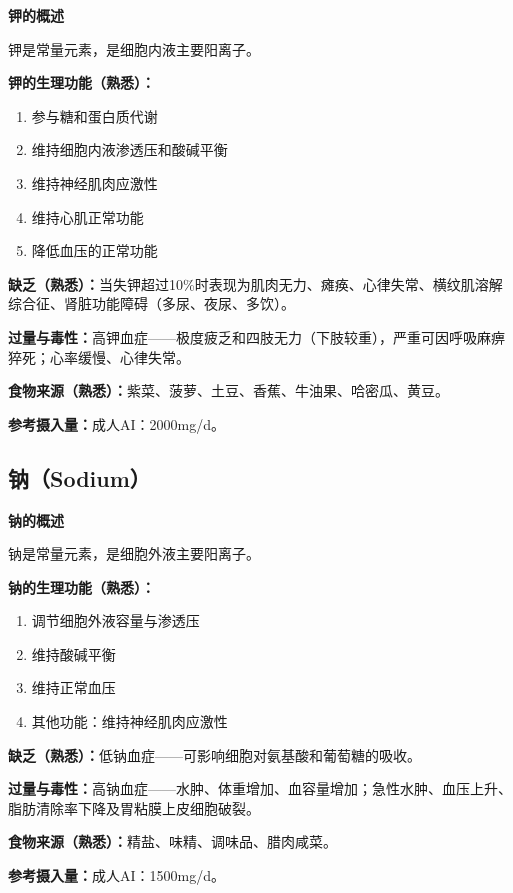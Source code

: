 \begin{tipbox}
\textbf{钾的概述}

钾是常量元素，是细胞内液主要阳离子。

\textbf{钾的生理功能（熟悉）：}
\begin{enumerate}[leftmargin=*]
    \item 参与糖和蛋白质代谢
    \item 维持细胞内液渗透压和酸碱平衡
    \item 维持神经肌肉应激性
    \item 维持心肌正常功能
    \item 降低血压的正常功能
\end{enumerate}

\textbf{缺乏（熟悉）：}当失钾超过10\%时表现为肌肉无力、瘫痪、心律失常、横纹肌溶解综合征、肾脏功能障碍（多尿、夜尿、多饮）。

\textbf{过量与毒性：}高钾血症——极度疲乏和四肢无力（下肢较重），严重可因呼吸麻痹猝死；心率缓慢、心律失常。

\textbf{食物来源（熟悉）：}紫菜、菠萝、土豆、香蕉、牛油果、哈密瓜、黄豆。

\textbf{参考摄入量：}成人AI：2000mg/d。
\end{tipbox}

\subsection{钠（Sodium）}

\begin{tipbox}
\textbf{钠的概述}

钠是常量元素，是细胞外液主要阳离子。

\textbf{钠的生理功能（熟悉）：}
\begin{enumerate}[leftmargin=*]
    \item 调节细胞外液容量与渗透压
    \item 维持酸碱平衡
    \item 维持正常血压
    \item 其他功能：维持神经肌肉应激性
\end{enumerate}

\textbf{缺乏（熟悉）：}低钠血症——可影响细胞对氨基酸和葡萄糖的吸收。

\textbf{过量与毒性：}高钠血症——水肿、体重增加、血容量增加；急性水肿、血压上升、脂肪清除率下降及胃粘膜上皮细胞破裂。

\textbf{食物来源（熟悉）：}精盐、味精、调味品、腊肉咸菜。

\textbf{参考摄入量：}成人AI：1500mg/d。
\end{tipbox}

